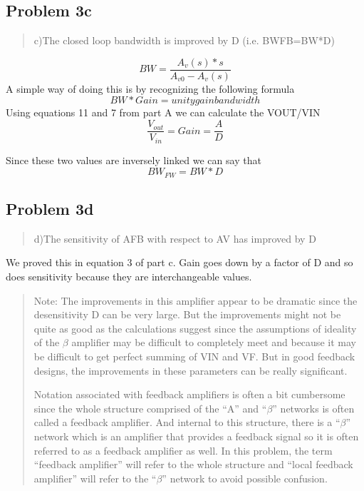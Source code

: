\documentclass[10pt,a4paper]{article}
\let\oldsubsection\subsection
\renewcommand{\subsection}{%
    \setcounter{equation}{0}%
    \oldsubsection%
}
\begin{document}
\subsection{Problem 3c}
\begin{quote}
c)The closed loop bandwidth is improved by D (i.e. BWFB=BW*D)
\end{quote}
\begin{equation}
BW = \frac{A_v(s) * s}{A_{v0} - A_v(s)}
\end{equation}
A simple way of doing this is by recognizing the following formula
\begin{equation}
BW * Gain = unity gain bandwidth 
\end{equation}
Using equations 11 and 7 from part A we can calculate the VOUT/VIN
\begin{equation}
\frac{V_{out}}{V_{in}} = Gain = \frac{A}{D}
\end{equation}

Since these two values are inversely linked we can say that
\begin{equation}
BW_{FW} = BW *D 
\end{equation}

\subsection{Problem 3d}
\begin{quote}
d)The sensitivity of AFB with respect to AV has improved by D
\end{quote}
We proved this in equation 3 of part c. Gain goes down by a factor of D and so does sensitivity because they are interchangeable values.





\begin{quote}

Note: The improvements in this amplifier appear to be dramatic since the
desensitivity D can be very large. But the improvements might not be
quite as good as the calculations suggest since the assumptions of
ideality of the $\beta$ amplifier may be difficult to completely meet and
because it may be difficult to get perfect summing of VIN and VF. But in
good feedback designs, the improvements in these parameters can be
really significant.

Notation associated with feedback amplifiers is often a bit cumbersome
since the whole structure comprised of the ``A'' and ``$\beta$'' networks is
often called a feedback amplifier. And internal to this structure, there
is a ``$\beta$'' network which is an amplifier that provides a feedback signal
so it is often referred to as a feedback amplifier as well. In this
problem, the term ``feedback amplifier'' will refer to the whole
structure and ``local feedback amplifier'' will refer to the ``$\beta$''
network to avoid possible confusion.

\end{quote}
\end{document}
